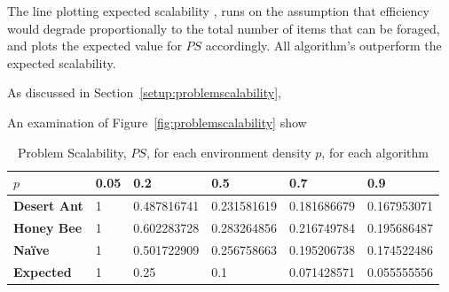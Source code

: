 
The line plotting expected scalability , runs on the assumption that efficiency would degrade proportionally to the total number of items that can be foraged, and plots the expected value for $PS$ accordingly. All algorithm's outperform the expected scalability. 


As discussed in Section~\ref{setup:problemscalability}, 


An examination of Figure~\ref{fig:problemscalability} show 

\begin{table}[]
\centering
\caption{Problem Scalability, $PS$, for each environment density $p$, for each algorithm}
\label{table:problemscalability}
\begin{tabular}{@{}llllll@{}}
\toprule
\textbf{$p$}                  & \textbf{0.05} & \textbf{0.2        } & \textbf{0.5}         & \textbf{0.7}         & \textbf{0.9}         \\ \midrule
\textbf{Desert Ant}           & 1    & 0.487816741 & 0.231581619 & 0.181686679 & 0.167953071 \\
\textbf{Honey Bee}            & 1    & 0.602283728 & 0.283264856 & 0.216749784 & 0.195686487 \\
\textbf{Na\"ive}              & 1    & 0.501722909 & 0.256758663 & 0.195206738 & 0.174522486 \\
\textbf{Expected} & 1    & 0.25        & 0.1         & 0.071428571 & 0.055555556 \\ \bottomrule
\end{tabular}
\end{table}

